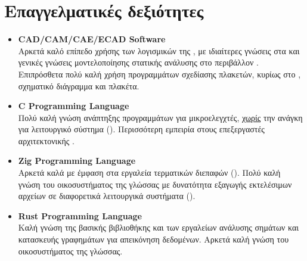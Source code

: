 \documentclass[a4paper,9pt]{extarticle}
\begin{document}

\pagebreak
\section*{Επαγγελματικές δεξιότητες}
\begin{itemize}
{}
\item{\textbf{CAD/CAM/CAE/ECAD Software}} \\
        Αρκετά καλό επίπεδο χρήσης των λογισμικών της , με ιδιαίτερες γνώσεις στα
         και γενικές γνώσεις μοντελοποίησης στατικής ανάλυσης
        στο περιβάλλον . Επιπρόσθετα πολύ καλή χρήση προγραμμάτων σχεδίασης πλακετών,
        κυρίως στο , σχηματικό διάγραμμα και πλακέτα.\\

\item{\textbf{C Programming Language}}\\
        \noindent
        Πολύ καλή γνώση ανάπτηξης προγραμμάτων για μικροελεγχτές, \underline{χωρίς} την ανάγκη για
        λειτουργικό σύστημα ().
        Περισσότερη εμπειρία στους επεξεργαστές αρχιτεκτονικής .\\

\item{\textbf{Zig Programming Language}} \\
        Αρκετά καλά με έμφαση στα εργαλεία τερματικών διεπαφών
        ().
        Πολύ καλή γνώση του οικοσυστήματος της γλώσσας με δυνατότητα εξαγωγής
        εκτελέσιμων αρχείων σε διαφορετικά λειτουργικά συστήματα (). \\

\item{\textbf{Rust Programming Language}} \\
        \noindent
        Καλή γνώση της βασικής βιβλιοθήκης και των εργαλείων ανάλυσης σημάτων
        και κατασκευής γραφημάτων για απεικόνηση δεδομένων.
        Αρκετά καλή γνώση του οικοσυστήματος της γλώσσας. \\


\end{itemize}
\end{document}
